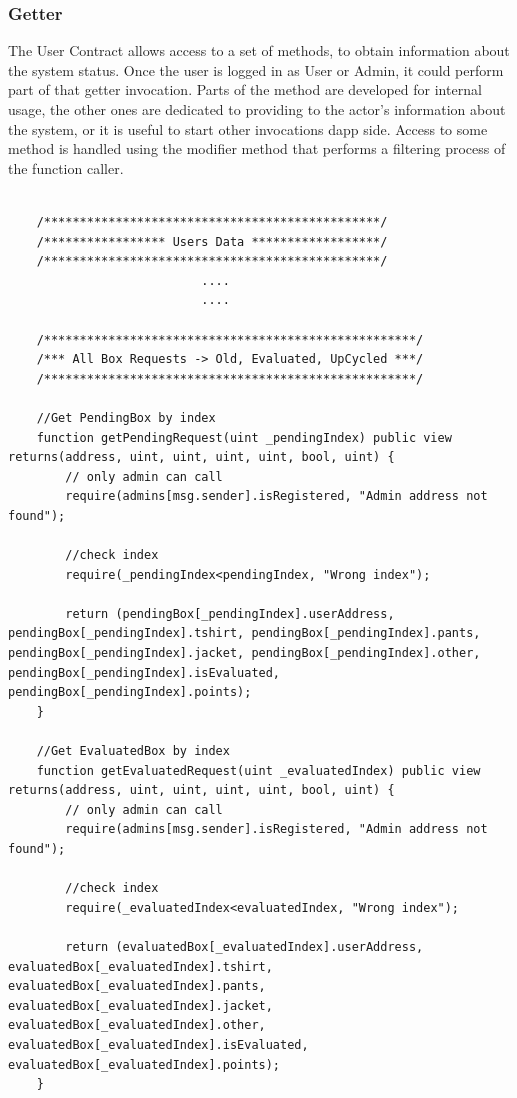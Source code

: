 \subsubsection{Getter}
The User Contract allows access to a set of methods, to obtain information about the system status.
Once the user is logged in as User or Admin, it could perform part of that getter invocation.
Parts of the method are developed for internal usage, the other ones are dedicated to providing to the actor's 
information about the system, or it is useful to start other invocations dapp side. Access to some method is 
handled using the modifier method that performs a filtering process of the function caller. 
\bigskip 

\begin{lstlisting}[language=Solidity]
    
    /***********************************************/
    /***************** Users Data ******************/
    /***********************************************/
                           ....
                           ....

    /****************************************************/
    /*** All Box Requests -> Old, Evaluated, UpCycled ***/
    /****************************************************/

    //Get PendingBox by index
    function getPendingRequest(uint _pendingIndex) public view returns(address, uint, uint, uint, uint, bool, uint) {
        // only admin can call
        require(admins[msg.sender].isRegistered, "Admin address not found");

        //check index
        require(_pendingIndex<pendingIndex, "Wrong index");

        return (pendingBox[_pendingIndex].userAddress, pendingBox[_pendingIndex].tshirt, pendingBox[_pendingIndex].pants, pendingBox[_pendingIndex].jacket, pendingBox[_pendingIndex].other, pendingBox[_pendingIndex].isEvaluated, pendingBox[_pendingIndex].points);
    }

    //Get EvaluatedBox by index
    function getEvaluatedRequest(uint _evaluatedIndex) public view returns(address, uint, uint, uint, uint, bool, uint) {
        // only admin can call
        require(admins[msg.sender].isRegistered, "Admin address not found");

        //check index
        require(_evaluatedIndex<evaluatedIndex, "Wrong index");

        return (evaluatedBox[_evaluatedIndex].userAddress, evaluatedBox[_evaluatedIndex].tshirt, evaluatedBox[_evaluatedIndex].pants, evaluatedBox[_evaluatedIndex].jacket, evaluatedBox[_evaluatedIndex].other, evaluatedBox[_evaluatedIndex].isEvaluated, evaluatedBox[_evaluatedIndex].points);
    }


\end{lstlisting}
